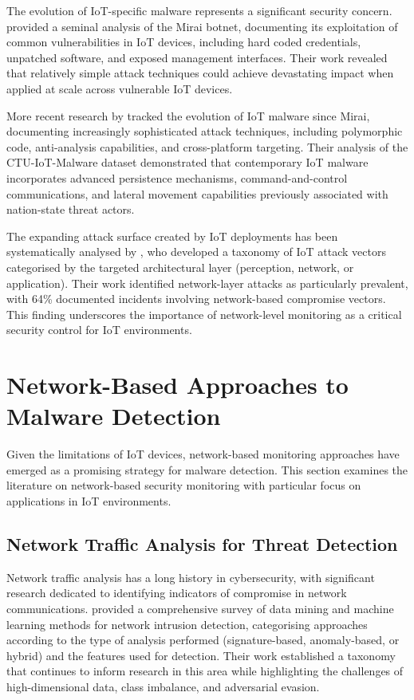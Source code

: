The evolution of IoT-specific malware represents a significant security concern. \cite{Antonakakis2017} provided a seminal analysis of the Mirai botnet, documenting its exploitation of common vulnerabilities in IoT devices, including hard coded credentials, unpatched software, and exposed management interfaces. Their work revealed that relatively simple attack techniques could achieve devastating impact when applied at scale across vulnerable IoT devices.

More recent research by \cite{Mehrban2021} tracked the evolution of IoT malware since Mirai, documenting increasingly sophisticated attack techniques, including polymorphic code, anti-analysis capabilities, and cross-platform targeting. Their analysis of the CTU-IoT-Malware dataset demonstrated that contemporary IoT malware incorporates advanced persistence mechanisms, command-and-control communications, and lateral movement capabilities previously associated with nation-state threat actors.

The expanding attack surface created by IoT deployments has been systematically analysed by \cite{HaddadPajouh2018}, who developed a taxonomy of IoT attack vectors categorised by the targeted architectural layer (perception, network, or application). Their work identified network-layer attacks as particularly prevalent, with 64\% documented incidents involving network-based compromise vectors. This finding underscores the importance of network-level monitoring as a critical security control for IoT environments.

\section{Network-Based Approaches to Malware Detection}

Given the limitations of IoT devices, network-based monitoring approaches have emerged as a promising strategy for malware detection. This section examines the literature on network-based security monitoring with particular focus on applications in IoT environments.

\subsection{Network Traffic Analysis for Threat Detection}

Network traffic analysis has a long history in cybersecurity, with significant research dedicated to identifying indicators of compromise in network communications. \cite{Buczak2016} provided a comprehensive survey of data mining and machine learning methods for network intrusion detection, categorising approaches according to the type of analysis performed (signature-based, anomaly-based, or hybrid) and the features used for detection. Their work established a taxonomy that continues to inform research in this area while highlighting the challenges of high-dimensional data, class imbalance, and adversarial evasion.

